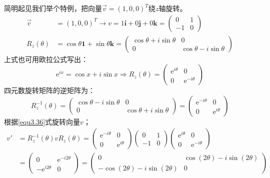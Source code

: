 简明起见我们举个特例，把向量$\vec{v} = (1, 0, 0)^T$绕$z$轴旋转。
\begin{align}
\label{equ3.39}
\vec{v} &= (1, 0, 0)^T \rightarrow v = 1\mathbf{i} + 0\mathbf{j} + 0\mathbf{k} =
	\begin{pmatrix}
		0 & 1 \\ -1 & 0
	\end{pmatrix}
\\
\label{equ3.40}
R_z(\theta) &= \cos \theta \mathbf{1} + \sin \theta \mathbf{k} =
	\begin{pmatrix}
		\cos \theta + i\sin \theta & 0 \\
		0 & \cos \theta - i\sin \theta
	\end{pmatrix}
\end{align}
上式也可用欧拉公式写出：
\begin{equation}
\label{equ3.41}
\mathrm{e}^{ix} = \cos x + i\sin x
\Rightarrow
R_z(\theta) = \begin{pmatrix}
				\mathrm{e}^{i\theta} & 0 \\
				0 & \mathrm{e}^{-i\theta}
			  \end{pmatrix}
\end{equation}
四元数旋转矩阵的逆矩阵为：
\begin{equation}
\label{equ3.42}
R_z^{-1} (\theta) =
	\begin{pmatrix}
		\cos \theta - i\sin \theta & 0 \\
		0 & \cos \theta + i\sin \theta
	\end{pmatrix}
=
	\begin{pmatrix}
		\mathrm{e}^{-i\theta} & 0 \\
		0 & \mathrm{e}^{i\theta}
	\end{pmatrix}
\end{equation}
根据\eqref{equ3.36}式旋转向量$v$；
\begin{align}
v' &= R_z^{-1} (\theta) v R_z(\theta) =
	\begin{pmatrix}
		\mathrm{e}^{-i\theta} & 0 \\
		0 & \mathrm{e}^{i\theta}
	\end{pmatrix}
	\begin{pmatrix}
	0 & 1 \\ -1 & 0
	\end{pmatrix}
	\begin{pmatrix}
		\mathrm{e}^{i\theta} & 0 \\
		0 & \mathrm{e}^{-i\theta}
	\end{pmatrix}
\nonumber \\
\label{equ3.43}
&= \begin{pmatrix}
		0 & \mathrm{e}^{-i 2\theta} \\
		-\mathrm{e}^{i 2\theta} & 0
	\end{pmatrix}
= \begin{pmatrix}
		0 & \cos (2\theta) - i\sin (2\theta) \\
		-\cos (2\theta) - i\sin (2\theta) & 0
  \end{pmatrix}
\end{align}
